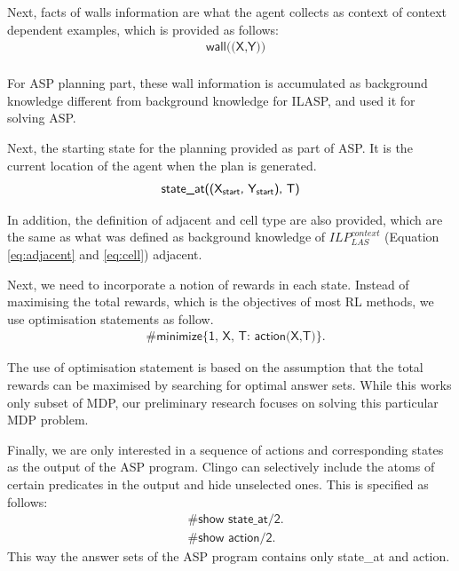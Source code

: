 Next, facts of walls information are what the agent collects as context of context dependent examples, which is provided as follows:
\begin{equation}
\begin{split}
&\textsf{wall((X,Y))}\\
\end{split}
\end{equation}
 
For ASP planning part, these wall information is accumulated as background knowledge different from background knowledge for ILASP, and used it for solving ASP. 

Next, the starting state for the planning provided as part of ASP. It is the current location of the agent when the plan is generated.
\begin{equation}
\begin{split}
\textsf{state\_at((X\textsubscript{start}, Y\textsubscript{start}), T)}
\end{split}
\end{equation}

In addition, the definition of adjacent and cell type are also provided, which are the same as what was defined as background knowledge of $ILP_{LAS}^{context}$ (Equation \ref{eq:adjacent} and \ref{eq:cell})
adjacent.

Next, we need to incorporate a notion of rewards in each state. Instead of maximising the total rewards, which is the objectives of most RL methods, 
we use optimisation statements as follow. 
\begin{equation}
\begin{split}
&\textsf{\#minimize\{1, X, T: action(X,T)\}}.
\end{split}
\end{equation}

The use of optimisation statement is based on the assumption that the total rewards can be maximised by searching for optimal answer sets. 
While this works only subset of MDP, our preliminary research focuses on solving this particular MDP problem. 
    
Finally, we are only interested in a sequence of actions and corresponding states as the output of the ASP program. 
Clingo can selectively include the atoms of certain predicates in the output and hide unselected ones. 
This is specified as follows:
\begin{equation}
\begin{split}
&\textsf{\#show state\_at/2.} \\
&\textsf{\#show action/2.}
\end{split}
\end{equation}
This way the answer sets of the ASP program contains only \textsf{state\_at} and \textsf{action}.

